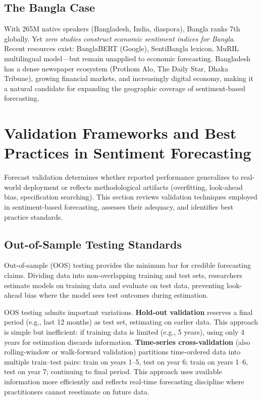 \documentclass[11pt]{article}
\begin{document}
\subsection{The Bangla Case}

With 265M native speakers (Bangladesh, India, diaspora), Bangla ranks 7th globally. Yet \textit{zero studies construct economic sentiment indices for Bangla}. Recent resources exist: BanglaBERT (Google), SentiBangla lexicon, MuRIL multilingual model—but remain unapplied to economic forecasting. Bangladesh has a dense newspaper ecosystem (Prothom Alo, The Daily Star, Dhaka Tribune), growing financial markets, and increasingly digital economy, making it a natural candidate for expanding the geographic coverage of sentiment-based forecasting.

\section{Validation Frameworks and Best Practices in Sentiment Forecasting}

Forecast validation determines whether reported performance generalizes to real-world deployment or reflects methodological artifacts (overfitting, look-ahead bias, specification searching). This section reviews validation techniques employed in sentiment-based forecasting, assesses their adequacy, and identifies best practice standards.

\subsection{Out-of-Sample Testing Standards}

Out-of-sample (OOS) testing provides the minimum bar for credible forecasting claims. Dividing data into non-overlapping training and test sets, researchers estimate models on training data and evaluate on test data, preventing look-ahead bias where the model sees test outcomes during estimation.

OOS testing admits important variations. \textbf{Hold-out validation} reserves a final period (e.g., last 12 months) as test set, estimating on earlier data. This approach is simple but inefficient: if training data is limited (e.g., 5 years), using only 4 years for estimation discards information. \textbf{Time-series cross-validation} (also rolling-window or walk-forward validation) partitions time-ordered data into multiple train--test pairs: train on years 1--5, test on year 6; train on years 1--6, test on year 7; continuing to final period. This approach uses available information more efficiently and reflects real-time forecasting discipline where practitioners cannot reestimate on future data.
\end{document}
